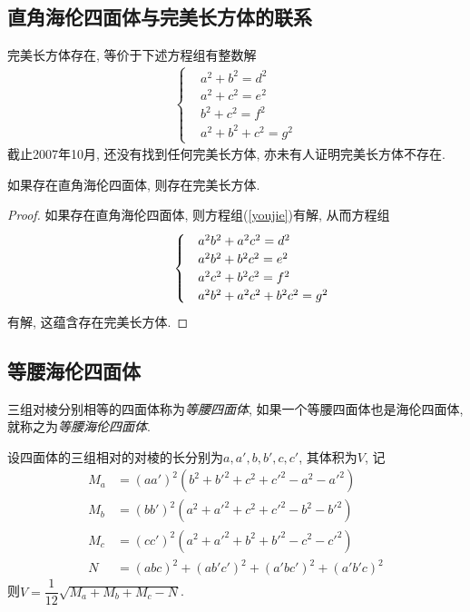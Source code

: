 \documentclass[12pt]{article}
\begin{document}
\subsection{直角海伦四面体与完美长方体的联系}
完美长方体存在, 等价于下述方程组有整数解
\begin{align*}
\begin{cases}
    &a^2+b^2=d^2\\
    &a^2+c^2=e^2\\
    &b^2+c^2=f^2\\
    &a^2+b^2+c^2=g^2
\end{cases}
\end{align*}
截止2007年10月, 还没有找到任何完美长方体, 亦未有人证明完美长方体不存在. 
\begin{theorem}
    如果存在直角海伦四面体, 则存在完美长方体.
\end{theorem}
\begin{proof}
    如果存在直角海伦四面体, 则方程组(\ref{youjie})有解, 从而方程组
    \begin{align*}\hspace{2.5em}\begin{cases}
        &a^2b^2+a^2c^2=d^2\\
        &a^2b^2+b^2c^2=e^2\\
        &a^2c^2+b^2c^2=f^2\\
        &a^2b^2+a^2c^2+b^2c^2=g^2
    \end{cases}\end{align*}
有解, 这蕴含存在完美长方体. 
\end{proof}

\subsection{等腰海伦四面体}
\begin{definition}
    三组对棱分别相等的四面体称为\emph{等腰四面体}, 如果一个等腰四面体也是海伦四面体, 就称之为\emph{等腰海伦四面体}. 
\end{definition}

设四面体的三组相对的对棱的长分别为$a,a',b,b',c,c'$, 其体积为$V$, 记
    \begin{align*}
        M_a &= (aa')^2(b^2+b'^2+c^2+c'^2-a^2-a'^2) \\
        M_b &= (bb')^2(a^2+a'^2+c^2+c'^2-b^2-b'^2)\\
        M_c &= (cc')^2(a^2+a'^2+b^2+b'^2-c^2-c'^2)\\
        N \ &= (abc)^2+(ab'c')^2+(a'bc')^2+(a'b'c)^2
    \end{align*}
则$V=\dfrac1{12}\sqrt{M_a+M_b+M_c-N}$.\\[1pt]
\end{document}
